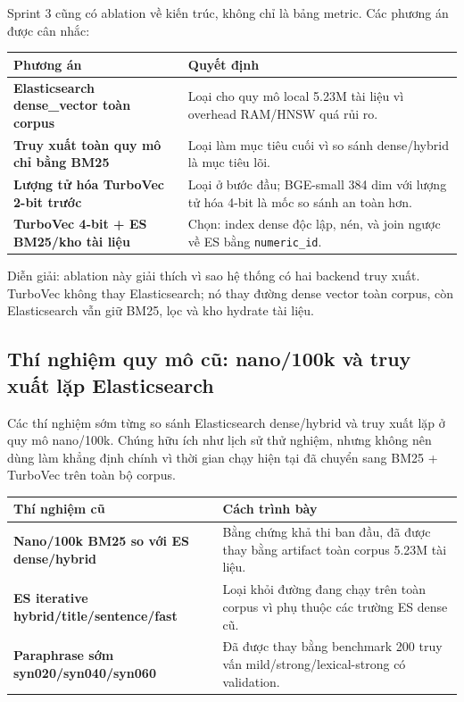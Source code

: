 \documentclass[11pt,a4paper]{article}
\begin{document}
Sprint 3 cũng có ablation về kiến trúc, không chỉ là bảng metric. Các phương án được cân nhắc:

\begin{tabularx}{\textwidth}{>{\bfseries}p{} Y}
\toprule
Phương án & Quyết định \\
\midrule
Elasticsearch dense\_vector toàn corpus & Loại cho quy mô local 5.23M tài liệu vì overhead RAM/HNSW quá rủi ro. \\
Truy xuất toàn quy mô chỉ bằng BM25 & Loại làm mục tiêu cuối vì so sánh dense/hybrid là mục tiêu lõi. \\
Lượng tử hóa TurboVec 2-bit trước & Loại ở bước đầu; BGE-small 384 dim với lượng tử hóa 4-bit là mốc so sánh an toàn hơn. \\
TurboVec 4-bit + ES BM25/kho tài liệu & Chọn: index dense độc lập, nén, và join ngược về ES bằng \texttt{numeric\_id}. \\
\bottomrule
\end{tabularx}

Diễn giải: ablation này giải thích vì sao hệ thống có hai backend truy xuất. TurboVec không thay
Elasticsearch; nó thay đường dense vector toàn corpus, còn Elasticsearch vẫn giữ BM25,
lọc và kho hydrate tài liệu.

\subsection{Thí nghiệm quy mô cũ: nano/100k và truy xuất lặp Elasticsearch}

Các thí nghiệm sớm từng so sánh Elasticsearch dense/hybrid và truy xuất lặp ở quy mô nano/100k.
Chúng hữu ích như lịch sử thử nghiệm, nhưng không nên dùng làm khẳng định chính vì thời gian chạy hiện tại
đã chuyển sang BM25 + TurboVec trên toàn bộ corpus.

\begin{tabularx}{\textwidth}{>{\bfseries}p{} Y}
\toprule
Thí nghiệm cũ & Cách trình bày \\
\midrule
Nano/100k BM25 so với ES dense/hybrid & Bằng chứng khả thi ban đầu, đã được thay bằng artifact toàn corpus 5.23M tài liệu. \\
ES iterative hybrid/title/sentence/fast & Loại khỏi đường đang chạy trên toàn corpus vì phụ thuộc các trường ES dense cũ. \\
Paraphrase sớm syn020/syn040/syn060 & Đã được thay bằng benchmark 200 truy vấn mild/strong/lexical-strong có validation. \\
\bottomrule
\end{tabularx}
\end{document}
